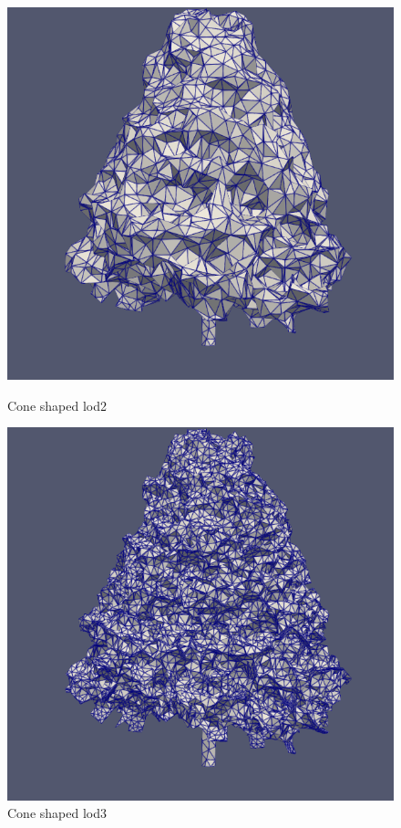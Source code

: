 \documentclass[12pt]{article}
\begin{document}
\begin{figure}[H]
\begin{minipage}{0.30\textwidth}
        \includegraphics[width=1\textwidth]{images/tree-cone_lod2.png}
        \caption{Cone shaped lod2}
    \end{minipage}
    \begin{minipage}{0.30\textwidth}
        \centering
        \includegraphics[width=1\textwidth]{images/tree-cone_lod3.png}
        \caption{Cone shaped lod3}
    \end{minipage}
\end{figure}
\end{document}
